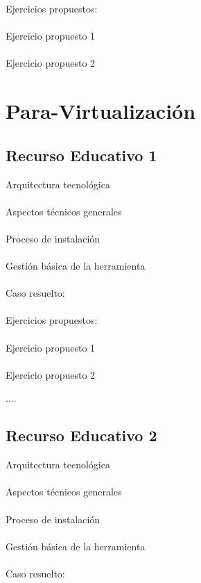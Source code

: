 Ejercicios propuestos: 
\\\\

Ejercicio propuesto 1
\\\\

Ejercicio propuesto 2









\section{Para-Virtualización}
\subsection{Recurso Educativo 1}
Arquitectura tecnológica
\\\\
Aspectos técnicos generales
\\\\
Proceso de instalación
\\\\
Gestión básica de la herramienta
\\\\
Caso resuelto: 
\\\\

Ejercicios propuestos: 
\\\\

Ejercicio propuesto 1
\\\\

Ejercicio propuesto 2

....

\subsection{Recurso Educativo 2}
Arquitectura tecnológica
\\\\
Aspectos técnicos generales
\\\\
Proceso de instalación
\\\\
Gestión básica de la herramienta
\\\\
Caso resuelto: 
\\\\

